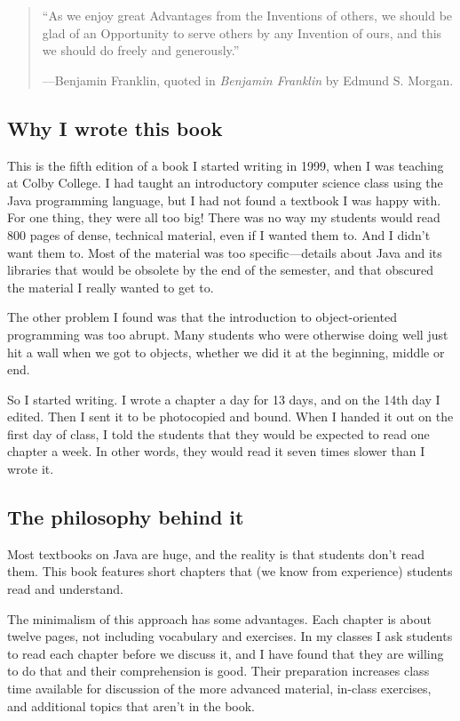 \begin{quote}
``As we enjoy great Advantages from the Inventions of others,
we should be glad of an Opportunity to serve others by any
Invention of ours, and this we should do freely and generously.''

---Benjamin Franklin, quoted in {\em Benjamin Franklin} by
Edmund S. Morgan.
\end{quote}

\subsection*{Why I wrote this book}

This is the fifth edition of a book I started writing in 1999,
when I was teaching at Colby College.  I had taught an introductory
computer science class using the Java programming language, but I
had not found a textbook I was happy with.  For one thing,
they were all too big!  There was no way my students would read
800 pages of dense, technical material, even if I wanted them to.
And I didn't want them to.  Most of the material was too
specific---details about Java and its libraries that would be obsolete
by the end of the semester, and that obscured the material I really
wanted to get to.

The other problem I found was that the introduction to object-oriented
programming was too abrupt.  Many students who were otherwise
doing well just hit a wall when we got to objects, whether we did
it at the beginning, middle or end.

So I started writing.  I wrote a chapter a day for 13 days, and on
the 14th day I edited.  Then I sent it to be photocopied and bound.
When I handed it out on the first day of class, I told the students
that they would be expected to read one chapter a week.  In other
words, they would read it seven times slower than I wrote it.

\subsection*{The philosophy behind it}

Most textbooks on Java are huge, and the reality is that students don't read them.
This book features short chapters that (we know from experience) students read and understand.

The minimalism of this approach has some advantages.
Each chapter is about twelve pages, not including vocabulary and exercises.
In my classes I ask students to read each chapter before we discuss it, and I have found that they are willing to do that and their comprehension is good.
Their preparation increases class time available for discussion of the more advanced material, in-class exercises, and additional topics that aren't in the book.

